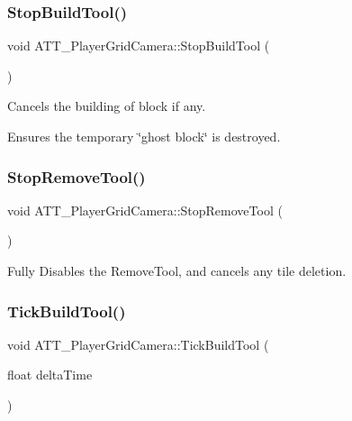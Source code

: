 \subsubsection{\texorpdfstring{StopBuildTool()}{StopBuildTool()}}
{\footnotesize\ttfamily void A\+T\+T\+\_\+\+Player\+Grid\+Camera\+::\+Stop\+Build\+Tool (\begin{DoxyParamCaption}{ }\end{DoxyParamCaption})\hspace{0.3cm}{\ttfamily [protected]}}



Cancels the building of block if any. 

Ensures the temporary \char`\"{}ghost block\char`\"{} is destroyed. \mbox{\label{class_a_t_t___player_grid_camera_aa29ae802ebeb61c95d7bfdba3021eb62}} 
\subsubsection{\texorpdfstring{StopRemoveTool()}{StopRemoveTool()}}
{\footnotesize\ttfamily void A\+T\+T\+\_\+\+Player\+Grid\+Camera\+::\+Stop\+Remove\+Tool (\begin{DoxyParamCaption}{ }\end{DoxyParamCaption})\hspace{0.3cm}{\ttfamily [protected]}}



Fully Disables the Remove\+Tool, and cancels any tile deletion. 

\mbox{\label{class_a_t_t___player_grid_camera_a67c2ba8b8b3f86ddddf25f3d11b70c8f}} 
\subsubsection{\texorpdfstring{TickBuildTool()}{TickBuildTool()}}
{\footnotesize\ttfamily void A\+T\+T\+\_\+\+Player\+Grid\+Camera\+::\+Tick\+Build\+Tool (\begin{DoxyParamCaption}\item[{float}]{delta\+Time }\end{DoxyParamCaption})\hspace{0.3cm}{\ttfamily [protected]}}



